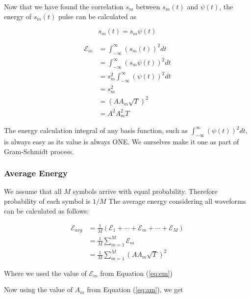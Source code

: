 \documentclass[a4paper]{article}
\numberwithin{equation}{subsection}
\begin{document}
	Now that we have found the correlation $s_m$ between $s_m(t)$ and $\psi(t)$, the energy of $s_m(t)$ pulse can be calculated as
	
	\begin{equation}\label{key}
	s_m(t) = s_m \psi(t)
	\end{equation}
	
	\begin{equation}\label{eq:em}
	\begin{aligned}
	\mathcal{E}_m&=\int_{-\infty}^{\infty} (s_m(t))^2 dt \\
	&= \int_{-\infty}^{\infty} (s_m \psi(t))^2 dt \\
	&= s_m^2 \int_{-\infty}^{\infty} ( \psi(t))^2 dt \\
	&= s_m^2 \\
	&= (A A_m \sqrt{T})^2 \\
	&= A^2 A_m^2 T
	\end{aligned}
	\end{equation}
	
	The energy calculation integral of any basis function, such as $\int_{-\infty}^{\infty} ( \psi(t))^2 dt$, is always easy as its value is always ONE. We ourselves make it one as part of Gram-Schmidt process.
	
	
	
	\subsubsection{Average Energy}
	We assume that all $M$ symbols arrive with equal probability. Therefore probability of each symbol is $1/M$ The average energy considering all waveforms can be calculated as follows:
	
	\begin{equation}\label{key}
	\begin{aligned}
	\mathcal{E}_{avg}&=\frac{1}{M}(\mathcal{E}_1+\cdots+\mathcal{E}_m+\cdots+\mathcal{E}_M)\\
	&=\frac{1}{M}\sum_{m=1}^{M}\mathcal{E}_m \\
	&=\frac{1}{M}\sum_{m=1}^{M} (A A_m \sqrt{T})^2
	\end{aligned}
	\end{equation} 
	
	Where we used the value of $\mathcal{E}_m$ from Equation (\ref{eq:em})
	
	
	Now using the value of $A_m$ from Equation (\ref{eq:am}), we get
	
\end{document}

